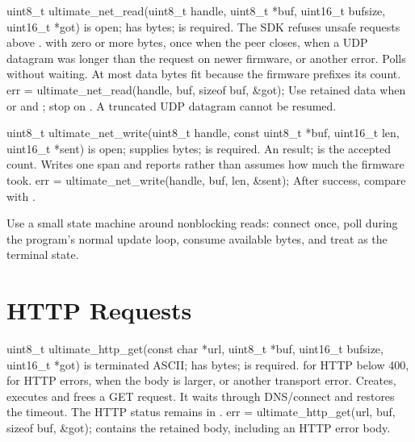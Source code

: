 \begin{referencechapter}
{uint8\_t ultimate\_net\_read(uint8\_t handle, uint8\_t *buf, uint16\_t bufsize, uint16\_t *got)}
{ is open;  has  bytes;  is required.
The SDK refuses unsafe requests above .}
{ with zero or more bytes,  once when the
peer closes,  when a UDP datagram was longer than
the request on newer firmware, or another error.}
{Polls without waiting. At most  data bytes
fit because the firmware prefixes its count.}
{err = ultimate\_net\_read(handle, buf, sizeof buf, \&got);}
{Use retained data when  or
 and ; stop on
. A truncated UDP datagram cannot be resumed.}

{uint8\_t ultimate\_net\_write(uint8\_t handle, const uint8\_t *buf, uint16\_t len, uint16\_t *sent)}
{ is open;  supplies  bytes;  is
required.}
{An  result;  is the accepted count.}
{Writes one span and reports rather than assumes how much the firmware took.}
{err = ultimate\_net\_write(handle, buf, len, \&sent);}
{After success, compare  with .}

\begin{tip}
Use a small state machine around nonblocking reads: connect once, poll during
the program's normal update loop, consume available bytes, and treat
 as the terminal state.
\end{tip}

\section{HTTP Requests}

{uint8\_t ultimate\_http\_get(const char *url, uint8\_t *buf, uint16\_t bufsize, uint16\_t *got)}
{ is terminated ASCII;  has  bytes;
 is required.}
{ for HTTP below 400,  for HTTP
errors,  when the body is larger, or another
transport error.}
{Creates, executes and frees a GET request. It waits through DNS/connect and
restores the timeout. The HTTP status remains in
.}
{err = ultimate\_http\_get(url, buf, sizeof buf, \&got);}
{ contains the retained body, including an HTTP error body.}


\end{referencechapter}
